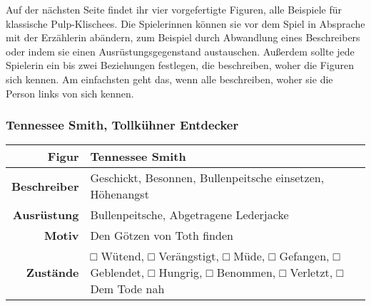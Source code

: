 \documentclass[]{article}
\begin{document}
Auf der nächsten Seite findet ihr vier vorgefertigte Figuren, alle
Beispiele für klassische Pulp-Klischees. Die Spielerinnen können sie vor
dem Spiel in Absprache mit der Erzählerin abändern, zum Beispiel durch
Abwandlung eines Beschreibers oder indem sie einen Ausrüstungsgegenstand
austauschen. Außerdem sollte jede Spielerin ein bis zwei Beziehungen
festlegen, die beschreiben, woher die Figuren sich kennen. Am
einfachsten geht das, wenn alle beschreiben, woher sie die Person links
von sich kennen.

\subsubsection{Tennessee Smith, Tollkühner
Entdecker}\label{tennessee-smith-tollkuxfchner-entdecker}

\begin{longtable}[]{@{}rl@{}}
\toprule
\begin{minipage}[b]{0.14\columnwidth}\raggedleft\strut
Figur
\strut\end{minipage} &
\begin{minipage}[b]{0.80\columnwidth}\raggedright\strut
Tennessee Smith
\strut\end{minipage}\tabularnewline
\midrule
\endhead
\begin{minipage}[t]{0.14\columnwidth}\raggedleft\strut
\textbf{Beschreiber}
\strut\end{minipage} &
\begin{minipage}[t]{0.80\columnwidth}\raggedright\strut
Geschickt, Besonnen, Bullenpeitsche einsetzen, Höhenangst
\strut\end{minipage}\tabularnewline
\begin{minipage}[t]{0.14\columnwidth}\raggedleft\strut
\textbf{Ausrüstung}
\strut\end{minipage} &
\begin{minipage}[t]{0.80\columnwidth}\raggedright\strut
Bullenpeitsche, Abgetragene Lederjacke
\strut\end{minipage}\tabularnewline
\begin{minipage}[t]{0.14\columnwidth}\raggedleft\strut
\textbf{Motiv}
\strut\end{minipage} &
\begin{minipage}[t]{0.80\columnwidth}\raggedright\strut
Den Götzen von Toth finden
\strut\end{minipage}\tabularnewline
\begin{minipage}[t]{0.14\columnwidth}\raggedleft\strut
\textbf{Zustände}
\strut\end{minipage} &
\begin{minipage}[t]{0.80\columnwidth}\raggedright\strut
□ Wütend, □ Verängstigt, □ Müde, □ Gefangen, □ Geblendet, □ Hungrig, □
Benommen, □ Verletzt, □ Dem Tode nah
\strut\end{minipage}\tabularnewline
\bottomrule
\end{longtable}
\end{document}
